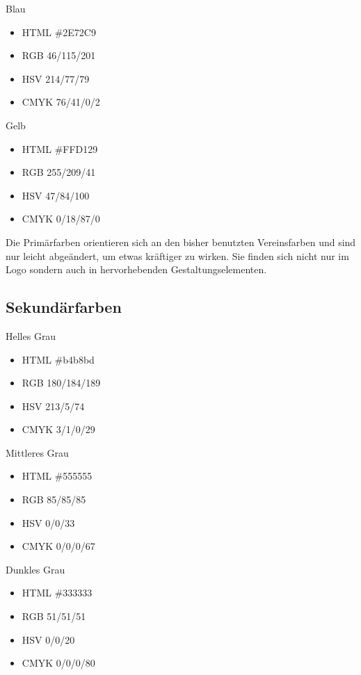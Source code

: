 \documentclass{article}
\begin{document}
\begin{samepage}
\cfield[LESBlue]
Blau
\begin{itemize}
\item HTML \#2E72C9
\item RGB 46/115/201
\item HSV 214/77/79
\item CMYK 76/41/0/2
\end{itemize}
\end{samepage}

\begin{samepage}
\cfield[LESYellow]
Gelb
\begin{itemize}
\item HTML \#FFD129
\item RGB 255/209/41
\item HSV 47/84/100
\item CMYK 0/18/87/0
\end{itemize}
\end{samepage}

Die Primärfarben orientieren sich an den bisher benutzten Vereinsfarben und sind nur leicht abgeändert, um etwas kräftiger zu wirken.
Sie finden sich nicht nur im Logo sondern auch in hervorhebenden Gestaltungselementen.

\subsection{Sekundärfarben}
\begin{samepage}
\cfield[SECLight]
Helles Grau
\begin{itemize}
\item HTML \#b4b8bd
\item RGB 180/184/189
\item HSV 213/5/74
\item CMYK 3/1/0/29
\end{itemize}
\end{samepage}

\begin{samepage}
\cfield[SECMedium]
Mittleres Grau
\begin{itemize}
\item HTML \#555555
\item RGB 85/85/85
\item HSV 0/0/33
\item CMYK 0/0/0/67
\end{itemize}
\end{samepage}

\begin{samepage}
\cfield[SECDark]
Dunkles Grau
\begin{itemize}
\item HTML \#333333
\item RGB 51/51/51
\item HSV 0/0/20
\item CMYK 0/0/0/80
\end{itemize}
\end{samepage}
\end{document}
